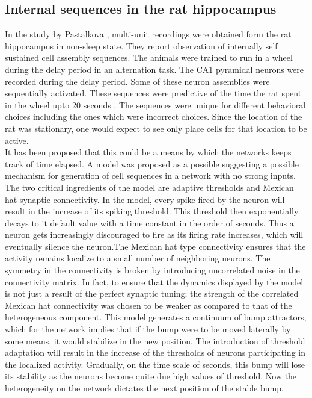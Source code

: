 \subsection{Internal sequences in the rat hippocampus}
In the study by Pastalkova \cite{Pastalkova2008a}, multi-unit recordings were obtained form the rat hippocampus in non-sleep state. They report observation of internally self sustained cell assembly sequences. The animals were trained to run in a wheel during the delay period in an alternation task. The CA1 pyramidal neurons were recorded during the delay period. Some of these neuron assemblies were sequentially activated. These sequences were predictive of the time the rat spent in the wheel upto 20 seconds \cite{Itskov2011a}. The sequences were unique for different behavioral choices including the ones which were incorrect choices. Since the location of the rat was stationary, one would expect to see only place cells for that location to be active.  \\  
[time/distance cells]
It has been proposed that this could be a means by which the networks keeps track of time elapsed. A model was proposed as a possible suggesting a possible mechanism for generation of cell sequences in a network with no strong inputs.  The two critical ingredients of the model are adaptive thresholds and Mexican hat synaptic connectivity. In the model, every spike fired by the neuron will result in the increase of its spiking threshold. This threshold then exponentially decays to it default value with a time constant in the order of seconds. Thus a neuron gets increasingly discouraged to fire as its firing rate increases, which will eventually silence the neuron.The Mexican hat type connectivity ensures that the activity remains localize to a small number of neighboring neurons. The symmetry in the connectivity is broken by introducing uncorrelated noise in the connectivity matrix. In fact, to ensure that the dynamics displayed by the model is not just a result of the perfect synaptic tuning; the strength of the correlated Mexican hat connectivity was chosen to be weaker as compared to that of the heterogeneous component. This model generates a continuum of bump attractors, which for the network implies that if the bump were to be moved laterally by some means, it would stabilize in the new position.  The introduction of threshold adaptation will result in the increase of the thresholds of neurons participating in the localized activity. Gradually, on the time scale of seconds, this bump will lose its stability as the neurons become quite due high values of threshold. Now the heterogeneity on the network dictates the next position of the stable bump.


